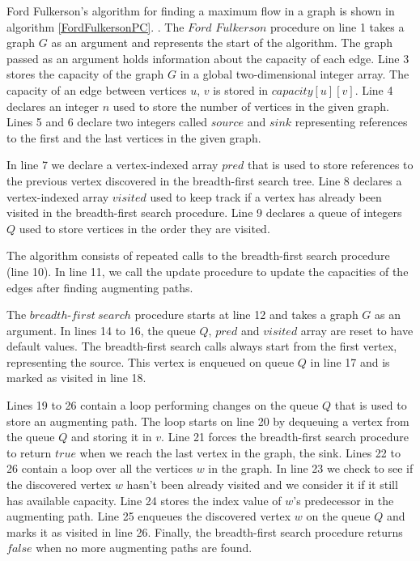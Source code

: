 \documentclass{l4proj}
\begin{document}
\noindent Ford Fulkerson's algorithm for finding a maximum flow in a graph is shown in algorithm \ref{FordFulkersonPC}. \cite{ford1956maximal}. The $Ford$ $Fulkerson$ procedure on line 1 takes a graph $G$ as an argument and represents the start of the algorithm. The graph passed as an argument holds information about the capacity of each edge. Line 3 stores the capacity of the graph $G$ in a global two-dimensional integer array. The capacity of an edge between vertices $u$, $v$ is stored in $capacity[u][v]$. Line 4 declares an integer $n$ used to store the number of vertices in the given graph. Lines 5 and 6 declare two integers called $source$ and $sink$ representing references to the first and the last vertices in the given graph.

\noindent In line 7 we declare a vertex-indexed array $pred$ that is used to store references to the previous vertex discovered in the breadth-first search tree. Line 8 declares a vertex-indexed array $visited$ used to keep track if a vertex has already been visited in the breadth-first search procedure. Line 9 declares a queue of integers $Q$ used to store vertices in the order they are visited.

\noindent The algorithm consists of repeated calls to the breadth-first search procedure (line 10). In line 11, we call the update procedure to update the capacities of the edges after finding augmenting paths.

\noindent The $breadth\textit{-}first ~ search$ procedure starts at line 12 and takes a graph $G$ as an argument. In lines 14 to 16, the queue $Q$, $pred$ and $visited$ array are reset to have default values. The breadth-first search calls always start from the first vertex, representing the source. This vertex is enqueued on queue $Q$ in line 17 and is marked as visited in line 18.

\noindent Lines 19 to 26 contain a loop performing changes on the queue $Q$ that is used to store an augmenting path. The loop starts on line 20 by dequeuing a vertex from the queue $Q$ and storing it in $v$. Line 21 forces the breadth-first search procedure to return $true$ when we reach the last vertex in the graph, the sink. Lines 22 to 26 contain a loop over all the vertices $w$ in the graph. In line 23 we check to see if the discovered vertex $w$ hasn't been already visited and we consider it if it still has available capacity. Line 24 stores the index value of $w$'s predecessor in the augmenting path. Line 25 enqueues the discovered vertex $w$ on the queue $Q$ and marks it as visited in line 26. Finally, the breadth-first search procedure returns $false$ when no more augmenting paths are found.
\end{document}
